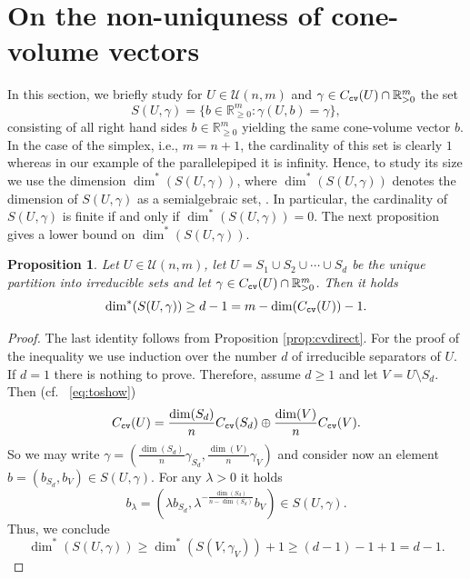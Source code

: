 \documentclass[11pt, a4paper, twoside, reqno]{amsart}
\newcommand{\R}{\mathbb{R}}
\newtheorem{proposition}[theorem]{Proposition}
\theoremstyle{definition}
\theoremstyle{remark}
\newcommand{\cv}{{\tt cv}}
\numberwithin{equation}{section}
\begin{document}
\section{On the non-uniquness of cone-volume vectors}

In this section, we briefly study for 
$U \in \mathcal{U}(n,m)$ and  $\gamma \in C_{\cv}(U) \cap \R_{>0}^m$  the set 
\begin{equation*}
    S(U, \gamma) = \{ b \in \R_{\geq 0}^m : \gamma(U, b) = \gamma \}, 
\end{equation*}
consisting of all right hand sides  $b \in \R_{\geq 0}^m$ yielding the same cone-volume vector $b$. In the case of the simplex, i.e., $m=n+1$, the cardinality of this set is clearly $1$ whereas in our example of the parallelepiped it is infinity. Hence, to study its size we use the dimension $\dim^*(S(U,\gamma))$, where  $\dim^*(S(U,\gamma))$ denotes the dimension of $S(U,\gamma)$ as a semialgebraic set, \cite[Definition 2.8.1]{bochnak2013real}. In particular,
the cardinality of $S(U,\gamma)$ is finite if and only if $\dim^*(S(U,\gamma))=0$. The next proposition gives a lower bound on  $\dim^*(S(U,\gamma))$. 

\begin{proposition}
  Let \( U \in \mathcal{U}(n,m) \), 
let $U=S_1\cup S_2 \cup
\cdots \cup S_d$ be the unique partition into irreducible sets and let $\gamma \in C_{\cv}(U) \cap \R_{>0}^m$. 
Then it holds
\begin{equation*}
    \dim^*(S(U, \gamma)) \geq d - 1 = m-\dim(C_\cv(U))-1.
\end{equation*}
\end{proposition}

\begin{proof} The last identity follows from Proposition \ref{prop:cvdirect}. For the proof of the inequality we use induction over the number $d$ of irreducible separators of $U$. If $d = 1$ there is nothing to prove. Therefore, assume $d \geq 1$ and let $V = U \setminus S_d$. Then (cf.~ \eqref{eq:toshow})
    \begin{equation*}
        C_\cv(U) = \frac{\dim(S_d)}{n} C_\cv(S_d) \oplus \frac{\dim(V)}{n} C_\cv(V).
    \end{equation*}
 So we may write  $\gamma = (\frac{\dim(S_d)}{n}\gamma_{S_d},\frac{\dim(V)}{n}\gamma_V)$ and  consider now an element $b = (b_{S_d},b_V) \in S(U,\gamma)$. %
    For any $\lambda > 0$ it holds 
    \begin{equation*}
        b_{\lambda} = \left(\lambda b_{S_d},\lambda^{-\frac{\dim(S_d)}{n - \dim(S_d)}} b_V \right) \in S(U,\gamma).
    \end{equation*}
    Thus, we conclude 
    \begin{equation*}
        \dim^* (S(U,\gamma)) \geq \dim^*(S(V,\gamma_V)) + 1 \geq (d-1) - 1 + 1 = d - 1.
    \end{equation*}
\end{proof}
\end{document}
